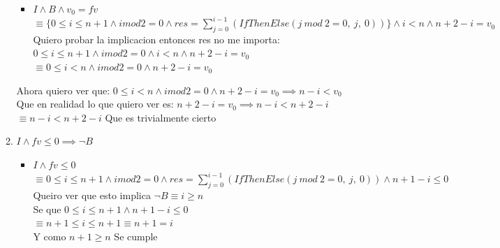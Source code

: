 \documentclass{article}
\begin{document}
\begin{itemize}
\begin{enumerate}
\begin{itemize}
            \item $I \land B \land v_0 = fv$\\
            $\equiv \{0 \leq i \leq n + 1 \land i mod 2 = 0 \land res = \sum_{j=0}^{i-1} (IfThenElse(j\ mod\ 2 = 0,\ j,\ 0))\} \land i < n \land n + 2 - i = v_0$\\
            Quiero probar la implicacion entonces res no me importa:\\
            $0 \leq i \leq n + 1 \land i mod 2 = 0 \land i < n \land n + 2 - i = v_0$\\
            $\equiv 0 \leq i < n \land i mod 2 = 0 \land n + 2 - i = v_0$
        \end{itemize}
        Ahora quiero ver que:
        $ 0 \leq i < n \land i mod 2 = 0 \land n + 2 - i = v_0 \implies n - i < v_0$\\
        Que en realidad lo que quiero ver es:
        $n + 2 - i = v_0 \implies n - i < n + 2 - i$\\
        $\equiv n - i < n + 2 - i$ Que es trivialmente cierto \checkmark

        \item $I \land fv \leq 0 \implies \lnot B$
        \begin{itemize}
            \item $I \land fv \leq 0$\\ 
            $\equiv 0 \leq i \leq n + 1 \land i mod 2 = 0 \land res = \sum_{j=0}^{i-1} (IfThenElse(j\ mod\ 2 = 0,\ j,\ 0)) \land n + 1 - i \leq 0$\\
            Queiro ver que esto implica $\lnot B \equiv i \geq n$\\
            Se que $0 \leq i \leq n + 1 \land n + 1 - i \leq 0$\\
            $\equiv n + 1 \leq i \leq n + 1 \equiv n + 1 = i$\\
            Y como $n + 1 \geq n$ Se cumple \checkmark
        \end{itemize}
    \end{enumerate}
\end{itemize}
\end{document}
